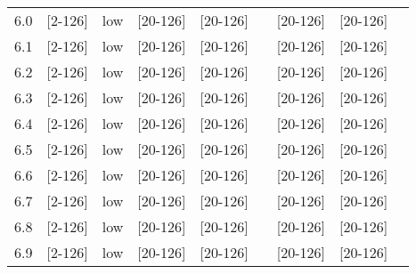 \documentclass{article}
\begin{document}
\begin{tabular}{| c | c | c | c | c | c | c | c | c |}
      6.0 & [2-126] & low & [20-126] & [20-126] &  & [20-126] & [20-126] &\\
      6.1 & [2-126] & low & [20-126] & [20-126] &  & [20-126] & [20-126] &\\
      6.2 & [2-126] & low & [20-126] & [20-126] &  & [20-126] & [20-126] &\\
      6.3 & [2-126] & low & [20-126] & [20-126] &  & [20-126] & [20-126] &\\
      6.4 & [2-126] & low & [20-126] & [20-126] &  & [20-126] & [20-126] &\\
      6.5 & [2-126] & low & [20-126] & [20-126] &  & [20-126] & [20-126] &\\
      6.6 & [2-126] & low & [20-126] & [20-126] &  & [20-126] & [20-126] &\\
      6.7 & [2-126] & low & [20-126] & [20-126] &  & [20-126] & [20-126] &\\
      6.8 & [2-126] & low & [20-126] & [20-126] &  & [20-126] & [20-126] &\\
      6.9 & [2-126] & low & [20-126] & [20-126] &  & [20-126] & [20-126] &\\
      \hline
    \end{tabular}
\end{document}
